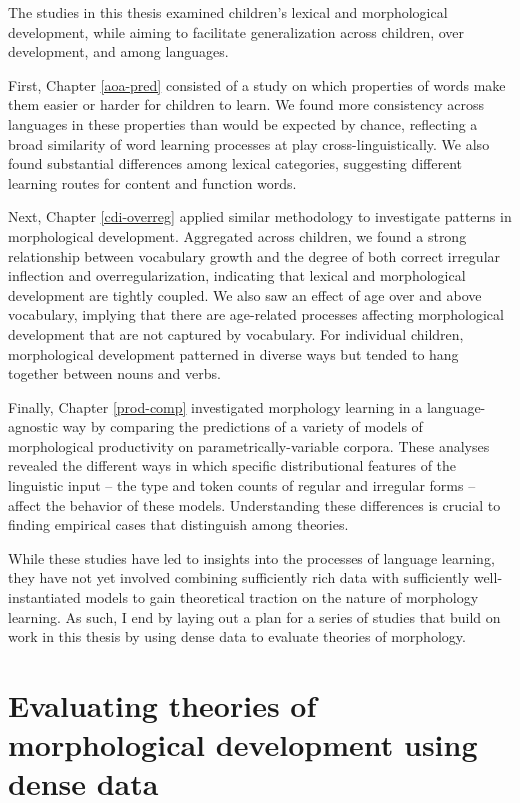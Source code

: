 \documentclass[
   11pt,
       ]{book}
\begin{document}
The studies in this thesis examined children's lexical and morphological development, while aiming to facilitate generalization across children, over development, and among languages.

First, Chapter \ref{aoa-pred} consisted of a study on which properties of words make them easier or harder for children to learn. We found more consistency across languages in these properties than would be expected by chance, reflecting a broad similarity of word learning processes at play cross-linguistically. We also found substantial differences among lexical categories, suggesting different learning routes for content and function words.

Next, Chapter \ref{cdi-overreg} applied similar methodology to investigate patterns in morphological development. Aggregated across children, we found a strong relationship between vocabulary growth and the degree of both correct irregular inflection and overregularization, indicating that lexical and morphological development are tightly coupled. We also saw an effect of age over and above vocabulary, implying that there are age-related processes affecting morphological development that are not captured by vocabulary. For individual children, morphological development patterned in diverse ways but tended to hang together between nouns and verbs.

Finally, Chapter \ref{prod-comp} investigated morphology learning in a language-agnostic way by comparing the predictions of a variety of models of morphological productivity on parametrically-variable corpora. These analyses revealed the different ways in which specific distributional features of the linguistic input -- the type and token counts of regular and irregular forms -- affect the behavior of these models. Understanding these differences is crucial to finding empirical cases that distinguish among theories.

While these studies have led to insights into the processes of language learning, they have not yet involved combining sufficiently rich data with sufficiently well-instantiated models to gain theoretical traction on the nature of morphology learning. As such, I end by laying out a plan for a series of studies that build on work in this thesis by using dense data to evaluate theories of morphology.

\hypertarget{evaluating-theories-of-morphological-development-using-dense-data}{%
\section{Evaluating theories of morphological development using dense data}\label{evaluating-theories-of-morphological-development-using-dense-data}}
\end{document}
